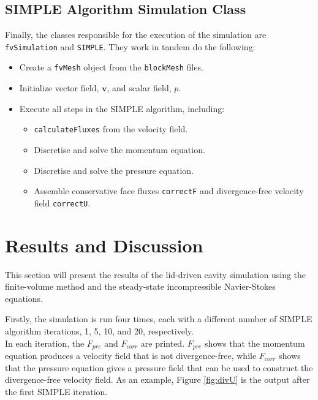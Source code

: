 \documentclass[final,3p,times,twocolumn]{elsarticle}
\begin{document}
\subsection{SIMPLE Algorithm Simulation Class}
Finally, the classes responsible for the execution of the simulation are \texttt{fvSimulation} and \texttt{SIMPLE}. They work in tandem do the following:
\begin{itemize}
    \item Create a \texttt{fvMesh} object from the \texttt{blockMesh} files.
    \item Initialize vector field, $\mathbf{v}$, and scalar field, $p$.
    \item Execute all steps in the SIMPLE algorithm, including:
    \begin{itemize}
        \item \texttt{calculateFluxes} from the velocity field.
        \item Discretise and solve the momentum equation.
        \item Discretise and solve the pressure equation.
        \item Assemble conservative face fluxes \texttt{correctF} and divergence-free velocity field \texttt{correctU}.
    \end{itemize}
\end{itemize}

\section{Results and Discussion}
This section will present the results of the lid-driven cavity simulation using the finite-volume method and the steady-state incompressible Navier-Stokes equations. 

Firstly, the simulation is run four times, each with a different number of SIMPLE algorithm iterations, 1, 5, 10, and 20, respectively. \\ In each iteration, the $F_{pre}$ and $F_{corr}$ are printed. $F_{pre}$ shows that the momentum equation produces a velocity field that is not divergence-free, while $F_{corr}$ shows that the pressure equation gives a pressure field that can be used to construct the divergence-free velocity field. As an example, Figure \ref{fig:divU} is the output after the first SIMPLE iteration.
\end{document}
